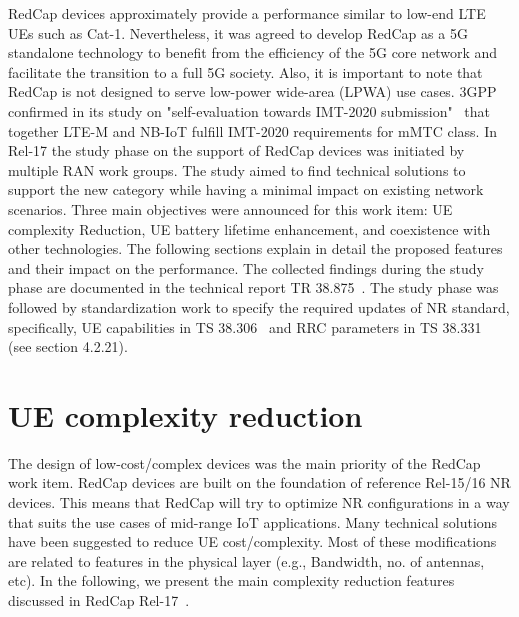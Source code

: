 \documentclass[]{IEEEtran}
\begin{document}
RedCap devices approximately provide a performance similar to low-end LTE UEs such as Cat-1.
Nevertheless, it was agreed to develop RedCap as a 5G standalone technology to benefit from the efficiency of the 5G core network and facilitate the transition to a full 5G society.
Also, it is important to note that RedCap is not designed to serve low-power wide-area (LPWA) use cases.
3GPP confirmed in its study on "self-evaluation towards IMT-2020 submission"~\cite{3gpp_study_nodate-1_37.910} that together LTE-M and NB-IoT fulfill IMT-2020 requirements for mMTC class.
In Rel-17 the study phase on the support of RedCap devices was initiated by multiple RAN work groups.
The study aimed to find technical solutions to support the new category while having a minimal impact on existing network scenarios.
Three main objectives were announced for this work item: UE complexity Reduction, UE battery lifetime enhancement, and coexistence with other technologies.
The following sections explain in detail the proposed features and their impact on the performance.
The collected findings during the study phase are documented in the technical report TR 38.875~\cite{3gpp_study_2021_38.875}.
The study phase was followed by standardization work to specify the required updates of NR standard, specifically,  UE capabilities in TS 38.306~\cite{3gpp_nr_nodate-4_38.306} and RRC parameters in TS 38.331~\cite{3gpp_nr_nodate-3_38.331} (see section 4.2.21).

\section{UE complexity reduction}
\label{sec:4-complexity-reduction}



The design of low-cost/complex devices was the main priority of the RedCap work item.
RedCap devices are built on the foundation of reference Rel-15/16 NR devices.
This means that RedCap will try to optimize NR configurations in a way that suits the use cases of mid-range IoT applications.
Many technical solutions have been suggested to reduce UE cost/complexity.
Most of these modifications are related to features in the physical layer (e.g., Bandwidth, no. of antennas, etc).
In the following, we present the main complexity reduction features discussed in RedCap Rel-17~\cite{3gpp_study_2021_38.875}.
\end{document}

